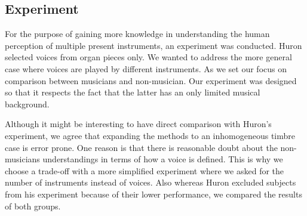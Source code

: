 \subsection{Experiment}
For the purpose of gaining more knowledge in understanding the human perception of multiple present instruments, an experiment was conducted. Huron selected voices from organ pieces only. We wanted to address the more general case where voices are played by different instruments.
As we set our focus on comparison between musicians and non-musician.
Our experiment was designed so that it respects the fact that the latter has an only limited musical background.
\par
Although it might be interesting to have direct comparison with Huron's experiment, we agree that expanding the methods to an inhomogeneous timbre case is error prone. One reason is that there is reasonable doubt about the non-musicians understandings in terms of how a voice is defined. This is why we choose a trade-off with a more simplified experiment where we asked for the number of instruments instead of voices. Also whereas Huron \cite{huron89}  excluded subjects from his experiment because of their lower performance, we compared the results of both groups.

